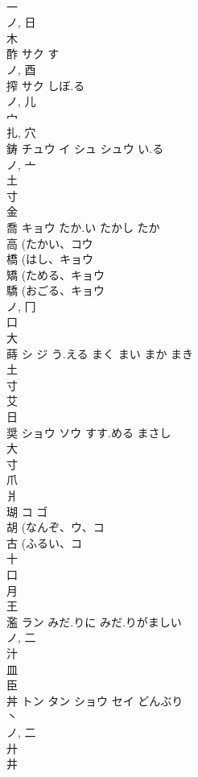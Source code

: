 \documentclass[8pt]{extreport}
\begin{document}
\begin{CJK}{UTF8}{min}
\\	一 
\\	ノ, 日 
\\	木 
\\	酢	サク	す	
\\	ノ, 酉 
\\	搾	サク	しぼ.る	
\\	ノ, 儿 
\\	宀 
\\	扎, 穴 
\\	鋳	チュウ イ シュ シュウ	い.る	
\\	ノ, 亠 
\\	土 
\\	寸 
\\	金 
\\	喬	キョウ	たか.い たかし たか	
\\	高 (たかい、コウ 
\\	橋 (はし、キョウ 
\\	矯 (ためる、キョウ 
\\	驕 (おごる、キョウ 
\\	ノ, 冂 
\\	口 
\\	大 
\\	蒔	シ ジ	う.える まく まい まか まき	
\\	土 
\\	寸 
\\	艾 
\\	日 
\\	奨	ショウ ソウ	すす.める まさし	
\\	大 
\\	寸 
\\	爪 
\\	爿 
\\	瑚	コ ゴ		
\\	胡 (なんぞ、ウ、コ 
\\	古 (ふるい、コ 
\\	十 
\\	口 
\\	月 
\\	王 
\\	濫	ラン	みだ.りに みだ.りがましい	
\\	ノ, 二 
\\	汁 
\\	皿 
\\	臣 
\\	丼	トン タン ショウ セイ	どんぶり	
\\	丶 
\\	ノ, 二 
\\	廾 
\\	井 

\end{CJK}
\end{document}
